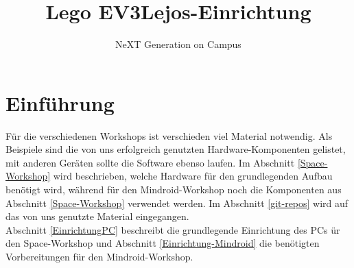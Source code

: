 \documentclass[
	ngerman,
	accentcolor=1c,%
	]{tudapub}
\begin{document}




\title{Lego EV3\newline Lejos-Einrichtung}
\subtitle{NeXT Generation on Campus}
\date{}





\maketitle


\newpage


\tableofcontents

\section{Einf\"uhrung}
F\"ur die verschiedenen Workshops ist verschieden viel Material notwendig. Als Beispiele sind die von uns erfolgreich genutzten Hardware-Komponenten gelistet, mit anderen Ger\"aten sollte die Software ebenso laufen.\newline
Im Abschnitt \ref{Space-Workshop} wird beschrieben, welche Hardware f\"ur den grundlegenden Aufbau ben\"otigt wird, w\"ahrend f\"ur den Mindroid-Workshop noch die Komponenten aus Abschnitt \ref{Space-Workshop} verwendet werden.\newline
Im Abschnitt \ref{git-repos} wird auf das von uns genutzte Material eingegangen.\\
Abschnitt \ref{EinrichtungPC} beschreibt die grundlegende Einrichtung des PCs \"ur den Space-Workshop und Abschnitt \ref{Einrichtung-Mindroid} die ben\"otigten Vorbereitungen f\"ur den Mindroid-Workshop.
\end{document}
